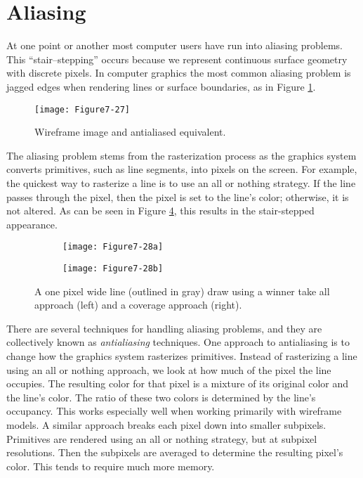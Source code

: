 \section{Aliasing}

At one point or another most computer users have run into aliasing problems. This ``stair--stepping'' occurs because we represent continuous surface geometry with discrete pixels. In computer graphics the most common aliasing problem is jagged edges when rendering lines or surface boundaries, as in Figure \ref{fig:Figure7-27}.

\begin{figure}[!htb]
	\centering
	\texttt{[image: Figure7-27]}\\
	\caption{Wireframe image and antialiased equivalent.}\label{fig:Figure7-27}
\end{figure}

The aliasing problem stems from the rasterization process as the graphics system converts primitives, such as line segments, into pixels on the screen. For example, the quickest way to rasterize a line is to use an all or nothing strategy. If the line passes through the pixel, then the pixel is set to the line's color; otherwise, it is not altered. As can be seen in Figure \ref{fig:Figure7-28}, this results in the stair-stepped appearance.

\begin{figure}[!htb]
	\centering
	\begin{subfigure}{0.48\linewidth}
		\centering
		\texttt{[image: Figure7-28a]}
		\caption*{}\label{fig:Figure7-28a}
	\end{subfigure}
	\hfill
	\begin{subfigure}{0.48\linewidth}
		\centering
		\texttt{[image: Figure7-28b]}
		\caption*{}\label{fig:Figure7-28b}
	\end{subfigure}%
	\caption{A one pixel wide line (outlined in gray) draw using a winner take all approach (left) and a coverage approach (right).}
	\label{fig:Figure7-28}
\end{figure}

There are several techniques for handling aliasing problems, and they are collectively known as \emph{antialiasing} techniques. One approach to antialiasing is to change how the graphics system rasterizes primitives. Instead of rasterizing a line using an all or nothing approach, we look at how much of the pixel the line occupies. The resulting color for that pixel is a mixture of its original color and the line's color. The ratio of these two colors is determined by the line's occupancy. This works especially well when working primarily with wireframe models. A similar approach breaks each pixel down into smaller subpixels. Primitives are rendered using an all or nothing strategy, but at subpixel resolutions. Then the subpixels are averaged to determine the resulting pixel's color. This tends to require much more memory.

